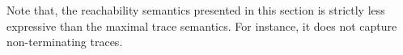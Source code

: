 Note that, the reachability semantics presented in this section is strictly less expressive than the maximal trace semantics. For instance, it does not capture non-terminating traces.




